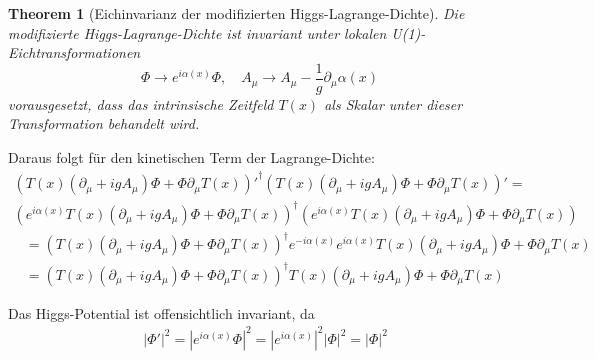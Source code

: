 \documentclass{article}
\newtheorem{theorem}{Theorem}[section]
\theoremstyle{definition}
\theoremstyle{remark}
\newcommand{\Tfield}{T(x)} %
\newcommand{\DhiggsTdef}{\Tfield (\partial_\mu + igA_\mu)\Phi + \Phi \partial_\mu \Tfield}
\begin{document}
		\begin{theorem}[Eichinvarianz der modifizierten Higgs-Lagrange-Dichte]
			Die modifizierte Higgs-Lagrange-Dichte ist invariant unter lokalen U(1)-Eichtransformationen
			\begin{equation}
				\Phi \rightarrow e^{i\alpha(x)}\Phi, \quad A_\mu \rightarrow A_\mu - \frac{1}{g}\partial_\mu \alpha(x)
			\end{equation}
			vorausgesetzt, dass das intrinsische Zeitfeld $\Tfield$ als Skalar unter dieser Transformation behandelt wird.
		\end{theorem}
		
Daraus folgt für den kinetischen Term der Lagrange-Dichte:
\begin{multline}
	{(\DhiggsTdef)'}^\dagger(\DhiggsTdef)' = \\
	(e^{i\alpha(x)}\DhiggsTdef)^\dagger(e^{i\alpha(x)}\DhiggsTdef)
\end{multline}
\begin{align}
	&= (\DhiggsTdef)^\dagger e^{-i\alpha(x)} e^{i\alpha(x)} \DhiggsTdef \\
	&= (\DhiggsTdef)^\dagger \DhiggsTdef
\end{align}

Das Higgs-Potential ist offensichtlich invariant, da
\begin{align}
	&|\Phi'|^2 = |e^{i\alpha(x)}\Phi|^2 = |e^{i\alpha(x)}|^2|\Phi|^2 = |\Phi|^2
\end{align}
\end{document}
